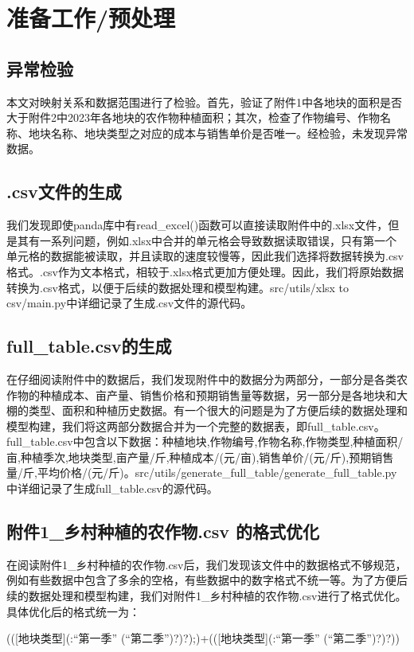 \documentclass[withoutpreface]{cumcmthesis}
\begin{document}
\section{准备工作/预处理}
\subsection{异常检验}
本文对映射关系和数据范围进行了检验。首先，验证了附件1中各地块的面积是否大于附件2中2023年各地块的农作物种植面积；其次，检查了作物编号、作物名称、地块名称、地块类型之对应的成本与销售单价是否唯一。经检验，未发现异常数据。
\subsection{.csv文件的生成}
我们发现即使panda库中有read\_excel()函数可以直接读取附件中的.xlsx文件，但是其有一系列问题，例如.xlsx中合并的单元格会导致数据读取错误，只有第一个单元格的数据能被读取，并且读取的速度较慢等，因此我们选择将数据转换为.csv格式。.csv作为文本格式，相较于.xlsx格式更加方便处理。因此，我们将原始数据转换为.csv格式，以便于后续的数据处理和模型构建。src/utils/xlsx to csv/main.py中详细记录了生成.csv文件的源代码。

\subsection{full\_table.csv的生成}
在仔细阅读附件中的数据后，我们发现附件中的数据分为两部分，一部分是各类农作物的种植成本、亩产量、销售价格和预期销售量等数据，另一部分是各地块和大棚的类型、面积和种植历史数据。有一个很大的问题是为了方便后续的数据处理和模型构建，我们将这两部分数据合并为一个完整的数据表，即full\_table.csv。full\_table.csv中包含以下数据：种植地块,作物编号,作物名称,作物类型,种植面积/亩,种植季次,地块类型,亩产量/斤,种植成本/(元/亩),销售单价/(元/斤),预期销售量/斤,平均价格/(元/斤)。src/utils/generate\_full\_table/generate\_full\_table.py中详细记录了生成full\_table.csv的源代码。

\subsection{附件1\_乡村种植的农作物.csv 的格式优化}
在阅读附件1\_乡村种植的农作物.csv后，我们发现该文件中的数据格式不够规范，例如有些数据中包含了多余的空格，有些数据中的数字格式不统一等。为了方便后续的数据处理和模型构建，我们对附件1\_乡村种植的农作物.csv进行了格式优化。具体优化后的格式统一为：
\begin{tcode}
    (([地块类型](:“第一季” (“第二季”)?)?);)+(([地块类型](:“第一季” (“第二季”)?)?))
\end{tcode}
\end{document}
